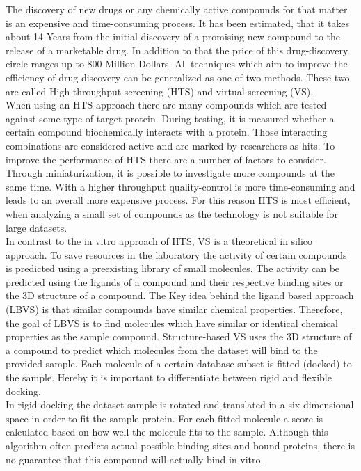 The discovery of new drugs or any chemically active compounds for that matter is an expensive and 
time-consuming process. It has been estimated, that it takes about 14 Years from the initial
discovery of a promising new compound to the release of a marketable drug\cite{Myers2001}. In 
addition to that the price of this drug-discovery circle ranges up to 800 Million Dollars\cite{DiMasi2003}.
All techniques which aim to improve the efficiency of drug discovery can be generalized as one of two methods. 
These two are called High-throughput-screening (HTS) and virtual screening (VS)\cite[]{Myers2001}.
\\
When using an HTS-approach there are many compounds which are tested 
against some type of target protein. During testing, it is measured whether 
a certain compound biochemically interacts with a protein. Those interacting combinations 
are considered active and are marked by researchers as hits. To improve the performance of HTS there are a number of
factors to consider. Through miniaturization, it is possible to investigate more compounds at the same time. 
With a higher throughput quality-control is more time-consuming and leads to an overall more expensive process.
For this reason HTS is most efficient, when analyzing a small set of compounds as the technology is not 
suitable for large datasets\cite{Mayr2008}.
\\
In contrast to the in vitro approach of HTS, VS is a theoretical in silico approach. To save resources in the laboratory 
the activity of certain compounds is predicted using a preexisting library of small molecules. 
The activity can be predicted using the ligands of a compound and their respective binding sites or the 3D structure of a compound.
The Key idea behind the ligand based approach (LBVS) is that similar compounds have similar chemical properties.
Therefore, the goal of LBVS is to find molecules which have similar or identical chemical properties as the sample compound\cite{Gimeno2019}.
Structure-based VS uses the 3D structure of a compound to predict which molecules from the dataset will bind to the provided sample.
Each molecule of a certain database subset is fitted (docked) to the sample.
Hereby it is important to differentiate between rigid and flexible docking.
\\
In rigid docking the dataset sample is rotated and translated in a six-dimensional space in order to fit the sample protein.
For each fitted molecule a score is calculated based on how well the molecule fits to the sample\cite{Lavecchia2013}.
Although this algorithm often predicts actual possible binding sites and bound proteins, there is no guarantee that this compound will actually bind in vitro. 
